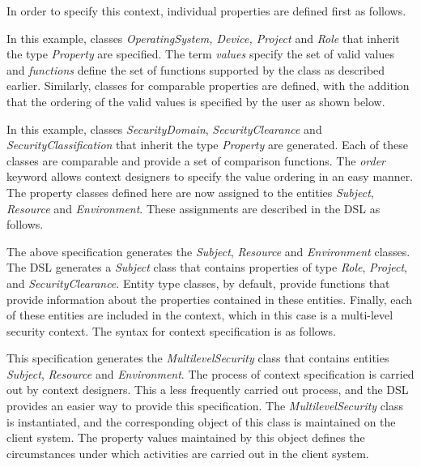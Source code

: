In order to specify this context, individual properties are defined first as follows. 


	
In this example, classes  {\em OperatingSystem, Device, Project} and {\em Role} that inherit the type {\em Property} are specified. The term {\em values} specify the set of valid values and {\em functions} define the set of functions supported by the class as described earlier. Similarly, classes for comparable properties are defined, with the addition that the ordering of the valid values is specified by the user as shown below. 



In this example, classes {\em SecurityDomain}, {\em SecurityClearance} and {\em SecurityClassification} that inherit the type {\em Property} are generated. Each of these classes are comparable and provide a set of comparison functions. The {\em order} keyword allows context designers to specify the value ordering in an easy manner. The property classes defined here are now assigned to the entities {\em Subject}, {\em Resource} and {\em Environment}. These assignments are described in the DSL as follows. 



The above specification generates the {\em Subject}, {\em Resource} and {\em Environment} classes. The DSL generates a {\em Subject} class that contains properties of type {\em Role}, {\em Project}, and {\em SecurityClearance}. Entity type classes, by default, provide functions that provide information about the  properties contained in these entities. Finally, each of these entities are included in the context, which in this case is a multi-level security context. The syntax for context specification is as follows. 



This specification generates the {\em MultilevelSecurity} class that contains entities {\em Subject}, {\em Resource} and {\em Environment}. The process of context specification is carried out by context designers. This a less frequently carried out process, and the DSL provides an easier way to provide this specification. The {\em MultilevelSecurity} class is instantiated, and the corresponding object of this class is maintained on the client system. The property values maintained by this object defines the circumstances under which activities are carried out in the client system. 


